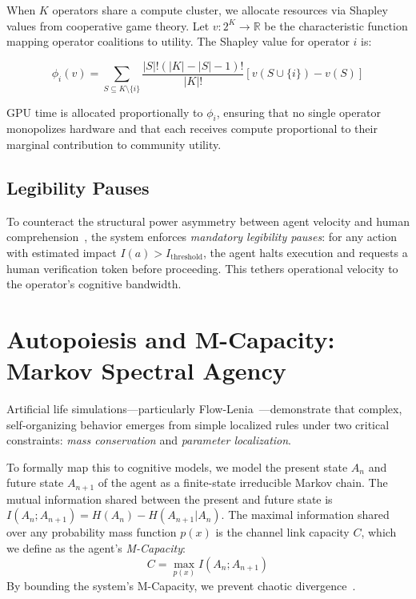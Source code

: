 \documentclass[11pt,a4paper]{article}
\begin{document}
When $K$ operators share a compute cluster, we allocate resources via Shapley values from cooperative game theory. Let $v: 2^K \to \mathbb{R}$ be the characteristic function mapping operator coalitions to utility. The Shapley value for operator $i$ is:

\begin{equation}
    \phi_i(v) = \sum_{S \subseteq K \setminus \{i\}} \frac{|S|!(|K|-|S|-1)!}{|K|!} \left[ v(S \cup \{i\}) - v(S) \right]
    \label{eq:shapley}
\end{equation}

\noindent GPU time is allocated proportionally to $\phi_i$, ensuring that no single operator monopolizes hardware and that each receives compute proportional to their marginal contribution to community utility.

\subsection{Legibility Pauses}

To counteract the structural power asymmetry between agent velocity and human comprehension~\citep{greatinversion2026}, the system enforces \emph{mandatory legibility pauses}: for any action with estimated impact $I(a) > I_{\text{threshold}}$, the agent halts execution and requests a human verification token before proceeding. This tethers operational velocity to the operator's cognitive bandwidth.

\section{Autopoiesis and M-Capacity: Markov Spectral Agency}
\label{sec:autopoiesis}

Artificial life simulations---particularly Flow-Lenia~\citep{plantec2023flow}---demonstrate that complex, self-organizing behavior emerges from simple localized rules under two critical constraints: \emph{mass conservation} and \emph{parameter localization}.

To formally map this to cognitive models, we model the present state $A_n$ and future state $A_{n+1}$ of the agent as a finite-state irreducible Markov chain. The mutual information shared between the present and future state is $I(A_n ; A_{n+1}) = H(A_n) - H(A_{n+1}|A_n)$. The maximal information shared over any probability mass function $p(x)$ is the channel link capacity $C$, which we define as the agent's \emph{M-Capacity}:
\begin{equation}
    C = \max_{p(x)} I(A_n ; A_{n+1})
\end{equation}
By bounding the system's M-Capacity, we prevent chaotic divergence~\citep{holliday2003capacity, treffert2009savant}.
\end{document}
